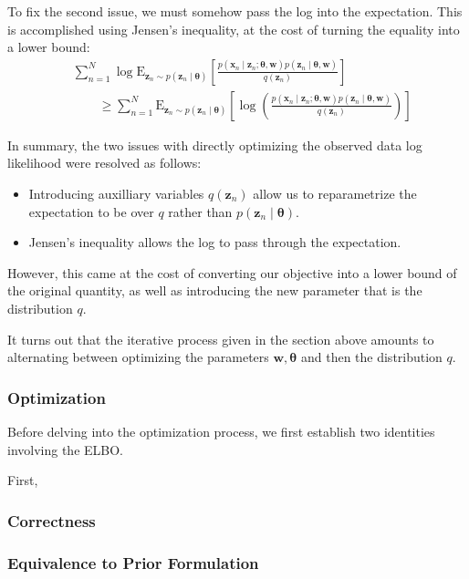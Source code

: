 To fix the second issue, we must somehow pass the log into the expectation. This is accomplished using Jensen's inequality, at the cost of turning the equality into a lower bound:
\begin{align}
    &\sum_{n = 1} ^N \log \mathrm{E}_{\mathbf{z}_n \sim p(\mathbf{z}_n \mid \boldsymbol{\theta})} \left[\frac{p(\mathbf{x}_n \mid \mathbf{z}_n; \boldsymbol\theta, \mathbf{w}) p(\mathbf{z}_n \mid \boldsymbol\theta, \mathbf{w} ) }{q(\mathbf{z}_n)}\right] \\
    &\qquad\geq \sum_{n = 1} ^N \mathrm{E}_{\mathbf{z}_n \sim p(\mathbf{z}_n \mid \boldsymbol{\theta})} \left[\log\left(\frac{p(\mathbf{x}_n \mid \mathbf{z}_n; \boldsymbol\theta, \mathbf{w}) p(\mathbf{z}_n \mid \boldsymbol\theta, \mathbf{w} ) }{q(\mathbf{z}_n)}\right)\right] 
\end{align}

In summary, the two issues with directly optimizing the observed data log likelihood were resolved as follows:
\begin{itemize}
    \item Introducing auxilliary variables $q(\mathbf{z}_n)$ allow us to reparametrize the expectation to be over $q$ rather than $p(\mathbf{z}_n \mid \boldsymbol{\theta})$. 
    \item Jensen's inequality allows the log to pass through the expectation.
\end{itemize}
However, this came at the cost of converting our objective into a lower bound of the original quantity, as well as introducing the new parameter that is the distribution $q$. 

It turns out that the iterative process given in the section above amounts to alternating between optimizing the parameters $\mathbf{w}, \mathbf{\theta}$ and then the distribution $q$. 

\subsubsection{Optimization}
Before delving into the optimization process, we first establish two identities involving the ELBO. 

First, 

\subsubsection{Correctness}

\subsubsection{Equivalence to Prior Formulation}

